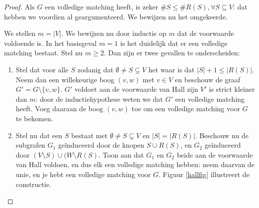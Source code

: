\begin{proof}
Als $G$ een volledige matching heeft, is zeker $\#S \leq \#R(S), \forall
S \subseteq V$: dat hebben we voordien al geargumenteerd. We bewijzen
nu het omgekeerde.

We stellen $m = |V|$. We bewijzen nu door inductie op $m$ dat de
voorwaarde voldoende is. In het basisgeval $m=1$ is het duidelijk dat
er een volledige matching bestaat. Stel nu $m \geq 2$. Dan zijn er
twee gevallen te onderscheiden:

\begin{enumerate}
\item 
Stel dat voor alle $S$ zodanig dat $\emptyset \neq S \subsetneq V$ het
waar is dat $|S| + 1 \leq |R(S)|$. Neem dan een willekeurige boog
$(v,w)$ met $v \in V$ en beschouw de graaf $G' = G \setminus
\{v,w\}$. $G'$ voldoet aan de voorwaarde van Hall zijn $V'$ is strict
kleiner dan $m$: door de inductiehypothese weten we dat $G'$ een
volledige matching heeft. Voeg daaraan de boog $(v,w)$ toe om een
volledige matching voor $G$ te bekomen.

\item
Stel nu dat een $S$ bestaat met $\emptyset \neq S \subsetneq V$ en $|S| =
|R(S)|$. Beschouw nu de subgrafen $G_1$ ge\"induceerd door de knopen
$S \cup R(S)$, en $G_2$ ge\"induceerd door $(V\setminus S) \cup (W \setminus
R(S)$. Toon aan dat $G_1$ en $G_2$ beide aan de voorwaarde van Hall
voldoen, en dus elk een volledige matching hebben: neem daarvan de
unie, en je hebt een volledige matching voor $G$. Figuur \ref{hallfig}
illustreert de constructie.
\end{enumerate}
\end{proof}



